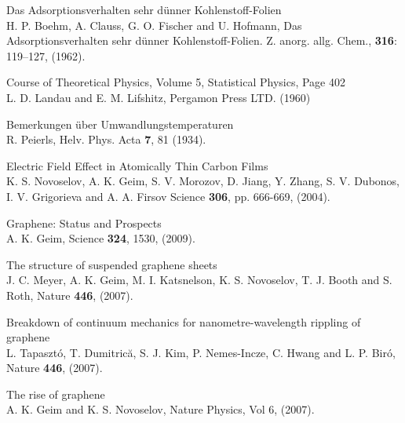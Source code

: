 \documentclass[12pt,a4paper]{report}
\begin{document}
	
	
	
	
	
	
	\tableofcontents
	
	
	
	
	
	
	
	
	
	\begin{thebibliography}{10}

Das Adsorptionsverhalten sehr dünner Kohlenstoff-Folien\\
H. P. Boehm, A. Clauss, G. O. Fischer and U. Hofmann,
Das Adsorptionsverhalten sehr dünner Kohlenstoff-Folien. Z. anorg. allg. Chem., {\bf 316}: 119–127, (1962).

Course of Theoretical Physics, Volume 5, Statistical Physics, Page 402\\
L. D. Landau and E. M. Lifshitz,
Pergamon Press LTD. (1960)

Bemerkungen über Umwandlungstemperaturen\\
R. Peierls,
Helv. Phys. Acta {\bf 7}, 81 (1934).

Electric Field Effect in Atomically Thin Carbon Films\\
K. S. Novoselov, A. K. Geim, S. V. Morozov, D. Jiang, Y. Zhang, S. V. Dubonos, I. V. Grigorieva and A. A. Firsov
Science {\bf 306}, pp. 666-669, (2004).

Graphene: Status and Prospects\\
A. K. Geim,
Science {\bf 324}, 1530, (2009).

The structure of suspended graphene sheets\\
J. C. Meyer, A. K. Geim, M. I. Katsnelson, K. S. Novoselov, T. J. Booth and S. Roth,
Nature {\bf 446}, (2007).

Breakdown of continuum mechanics for nanometre-wavelength rippling of graphene\\
L. Tapaszt{\' o}, T. Dumitric{\u a}, S. J. Kim, P. Nemes-Incze, C. Hwang and L. P. Bir{\' o},
Nature {\bf 446}, (2007).

 The rise of graphene\\
A. K. Geim and K. S. Novoselov,
Nature Physics, Vol 6, (2007).


\end{thebibliography}
\end{document}
